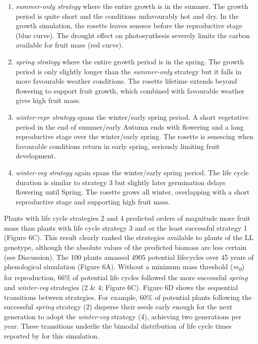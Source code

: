 \documentclass[phd]{infthesis}
\begin{document}
\begin{enumerate}
\def\labelenumi{\arabic{enumi}.}
\item
  \emph{summer-only strategy} where the entire growth is in the summer.
  The growth period is quite short and the conditions unfavourably hot
  and dry. In the growth simulation, the rosette leaves senesce before
  the reproductive stage (blue curve). The drought effect on
  photosynthesis severely limits the carbon available for fruit mass
  (red curve).
\item
  \emph{spring strategy} where the entire growth period is in the
  spring. The growth period is only slightly longer than the
  \emph{summer-only} strategy but it falls in more favourable weather
  conditions. The rosette lifetime extends beyond flowering to support
  fruit growth, which combined with favourable weather gives high fruit
  mass.
\item
  \emph{winter-repr strategy} spans the winter/early spring period. A
  short vegetative period in the end of summer/early Autumn ends with
  flowering and a long reproductive stage over the winter/early spring.
  The rosette is senescing when favourable conditions return in early
  spring, seriously limiting fruit development.
\item
  \emph{winter-veg strategy} again spans the winter/early spring period.
  The life cycle duration is similar to strategy 3 but slightly later
  germination delays flowering until Spring. The rosette grows all
  winter, overlapping with a short reproductive stage and supporting
  high fruit mass.
\end{enumerate}

Plants with life cycle strategies 2 and 4 predicted orders of magnitude
more fruit mass than plants with life cycle strategy 3 and or the least
successful strategy 1 (Figure 6C). This result clearly ranked the
strategies available to plants of the LL genotype, although the absolute
values of the predicted biomass are less certain (see Discussion). The
100 plants amassed 4905 potential lifecycles over 45 years of
phenological simulation (Figure 6A). Without a minimum mass threshold
(\emph{m\textsubscript{0}}) for reproduction, 66\% of potential life
cycles followed the more successful \emph{spring} and \emph{winter-veg}
strategies (2 \& 4; Figure 6C). Figure 6D shows the sequential
transitions between strategies. For example, 60\% of potential plants
following the successful \emph{spring} strategy (2) disperse their seeds
early enough for the next generation to adopt the \emph{winter-veg}
strategy (4), achieving two generations per year. These transitions
underlie the bimodal distribution of life cycle times reported by \citet{burghardt_modeling_2015}
for this simulation.
\end{document}
